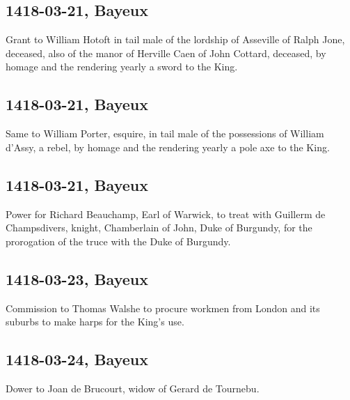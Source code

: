 \documentclass[a4paper,12pt,twoside]{book}
\begin{document}
            \subsection{1418-03-21, Bayeux}
            
                  Grant to William Hotoft in tail male of the lordship of Asseville of Ralph Jone, deceased, also of the manor of Herville Caen of John Cottard, deceased, by homage and the rendering yearly a sword to the King.
               
            \subsection{1418-03-21, Bayeux}
            
                  Same to William Porter, esquire, in tail male of the possessions of William d'Assy, a rebel, by homage and the rendering yearly a pole axe to the King.
               
            \subsection{1418-03-21, Bayeux}
            
                  Power for Richard Beauchamp, Earl of Warwick, to treat with Guillerm de Champsdivers, knight, Chamberlain of John, Duke of Burgundy, for the prorogation of the truce with the Duke of Burgundy.
               
            \subsection{1418-03-23, Bayeux}
            
                  Commission to Thomas Walshe to procure workmen from London and its suburbs to make harps for the King's use.
               
            \subsection{1418-03-24, Bayeux}
            
                  Dower to Joan de Brucourt, widow of Gerard de Tournebu.
               
\end{document}
